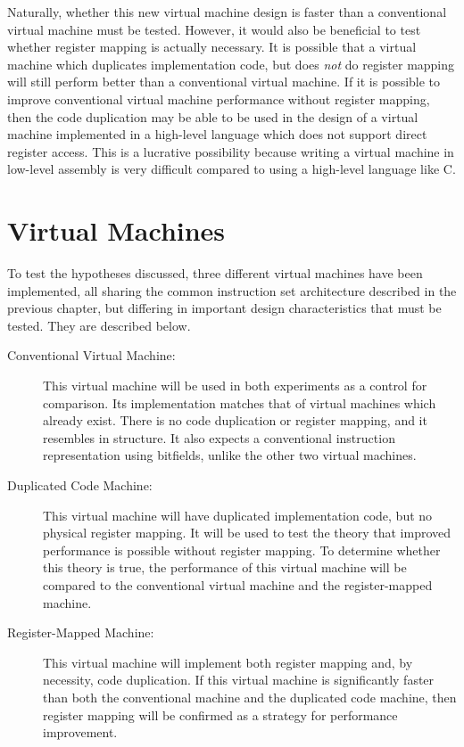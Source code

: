 	Naturally, whether this new virtual machine design is faster than a conventional virtual machine must be tested. However, it would also be beneficial to test whether register mapping is actually necessary. It is possible that a virtual machine which duplicates implementation code, but does \emph{not} do register mapping will still perform better than a conventional virtual machine. If it is possible to improve conventional virtual machine performance without register mapping, then the code duplication may be able to be used in the design of a virtual machine implemented in a high-level language which does not support direct register access. This is a lucrative possibility because writing a virtual machine in low-level assembly is very difficult compared to using a high-level language like C.
	
	\section{Virtual Machines}
	To test the hypotheses discussed, three different virtual machines have been implemented, all sharing the common instruction set architecture described in the previous chapter, but differing in important design characteristics that must be tested. They are described below.
	
	\begin{description}
		\item[Conventional Virtual Machine:] This virtual machine will be used in both experiments as a control for comparison. Its implementation matches that of virtual machines which already exist. There is no code duplication or register mapping, and it resembles  in structure. It also expects a conventional instruction representation using bitfields, unlike the other two virtual machines.
		\item[Duplicated Code Machine:] This virtual machine will have duplicated implementation code, but no physical register mapping. It will be used to test the theory that improved performance is possible without register mapping. To determine whether this theory is true, the performance of this virtual machine will be compared to the conventional virtual machine and the register-mapped machine.
		\item[Register-Mapped Machine:] This virtual machine will implement both register mapping and, by necessity,  code duplication. If this virtual machine is significantly faster than both the conventional machine and the duplicated code machine, then register mapping will be confirmed as a strategy for performance improvement.
	\end{description}
	

